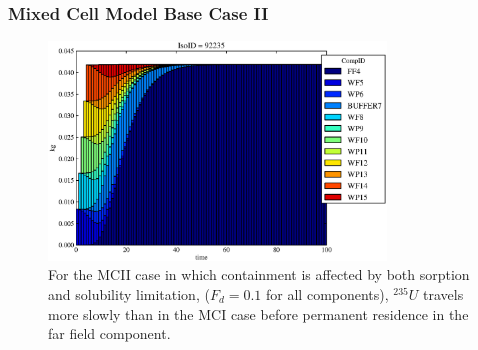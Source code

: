 
\begin{frame}[ctb!]
  \frametitle{Mixed Cell Model Base Case II}
\begin{figure}[ht]
\centering
\includegraphics[width=0.8\textwidth]{./images/mcIII.eps}
\caption[$^{235}U$ residence. Mixed Cell Coupled Sorption and Solubility Limitation.]{
For the MCII case in which containment is affected by both sorption and 
solubility limitation,
($F_{d}=0.1$ for all components), $^{235}U$ travels more slowly than in the MCI case 
before permanent residence in the far field component.
}
\label{fig:mcIIIall}
\end{figure}
\end{frame}

